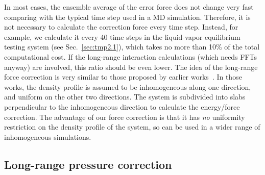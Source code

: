\documentclass[aps, pre, preprint]{revtex4}
\renewcommand{\v}[1]{\textbf{\textit{#1}}}
\begin{document}
In most cases, the ensemble average of the error force
does not change very fast comparing with the typical time step used in a MD
simulation. Therefore, it is not necessary to calculate
the correction force every time step. Instead, for example,
we calculate it every 40 time steps in the liquid-vapor equilibrium
testing system (see Sec.~\ref{sec:tmp2.1}), which takes
no more than 10\% of the total computational cost.
If the long-range interaction calculations (which needs FFTs anyway)
are involved, this ratio should be even lower.
The idea of the long-range force correction is very similar to those
proposed by earlier works~\cite{guo1997long, mecke1997molecular,
  janecek2006long, shen2007comparative}. In those works, the density
profile is assumed to be inhomogeneous along one direction, and uniform
on the other two directions.
The
system is subdivided into slabs perpendicular to the inhomogeneous direction to
calculate the energy/force correction. The advantage of our force
correction is that it has \emph{no} uniformity restriction on the density
profile of the system, so can be used in a wider range of
inhomogeneous simulations.





\subsection{Long-range pressure correction}

\end{document}
